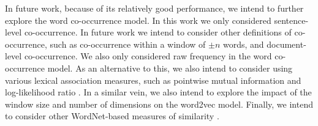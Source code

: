 \documentclass[11pt,a4paper]{article}
\begin{document}
In future work, because of its relatively good performance, we intend
to further explore the word co-occurrence model. In this work we only
considered sentence-level co-occurrence. In future work we intend to
consider other definitions of co-occurrence, such as co-occurrence
within a window of $\pm n$ words, and document-level co-occurrence. We
also only considered raw frequency in the word co-occurrence model. As
an alternative to this, we also intend to consider using various
lexical association measures, such as pointwise mutual information
\citep{Church1990} and log-likelihood ratio \citep{Dunning1993}. In a
similar vein, we also intend to explore the impact of the window size
and number of dimensions on the word2vec model. Finally, we intend to
consider other WordNet-based measures of similarity
\citep[e.g.,][]{Resnik:1995,Jiang1997}.







\end{document}
